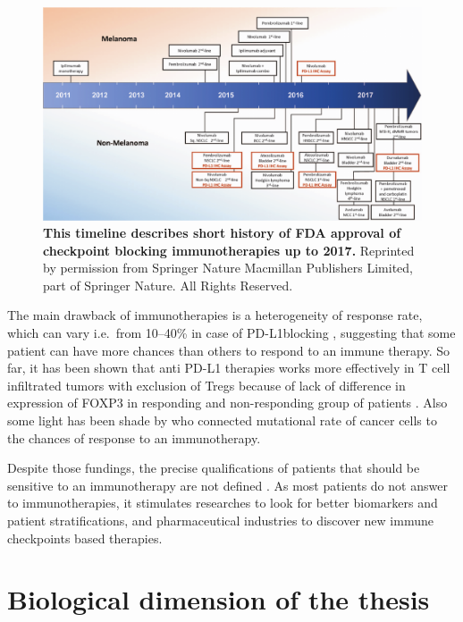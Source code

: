 \documentclass[12pt,]{book}
\theoremstyle{definition}
\theoremstyle{definition}
\theoremstyle{definition}
\theoremstyle{remark}
\begin{document}
\begin{figure}

{\centering \includegraphics[width=1\linewidth]{figures-ext/02-timeline-immunotherapies} 

}

\caption{\textbf{This timeline describes
short history of FDA approval of checkpoint blocking immunotherapies up
to 2017.} Reprinted by permission from Springer Nature
\citep{Taube2017a} Macmillan Publishers Limited, part of Springer
Nature. All Rights Reserved.}\label{fig:timeline-immunotherapies}
\end{figure}







The main drawback of immunotherapies is a heterogeneity of response
rate, which can vary i.e.~from 10--40\% in case of PD-L1blocking
\citep{Zou2016}, suggesting that some patient can have more chances than
others to respond to an immune therapy. So far, it has been shown that
anti PD-L1 therapies works more effectively in T cell infiltrated tumors
with exclusion of Tregs because of lack of difference in expression of
FOXP3 in responding and non-responding group of patients
\citep{Herbst2014}. Also some light has been shade by \citet{Rizvi2015}
who connected mutational rate of cancer cells to the chances of response
to an immunotherapy.

Despite those fundings, the precise qualifications of patients that
should be sensitive to an immunotherapy are not defined
\citep{Pitt2016}. As most patients do not answer to immunotherapies, it
stimulates researches to look for better biomarkers and patient
stratifications, and pharmaceutical industries to discover new immune
checkpoints based therapies.

\hypertarget{biological-dimension-of-the-thesis}{%
\section{Biological dimension of the
thesis}\label{biological-dimension-of-the-thesis}}
\end{document}
